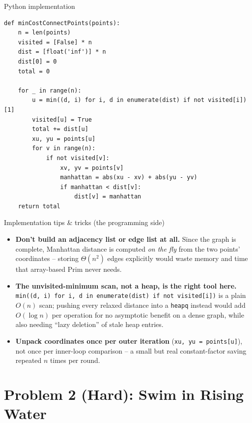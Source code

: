 \documentclass[11pt,aspectratio=169]{beamer}
\begin{document}
\begin{frame}[fragile]{Python implementation}
  \begin{lstlisting}[style=py,aboveskip=0pt,belowskip=0pt]
def minCostConnectPoints(points):
    n = len(points)
    visited = [False] * n
    dist = [float('inf')] * n
    dist[0] = 0
    total = 0

    for _ in range(n):
        u = min((d, i) for i, d in enumerate(dist) if not visited[i])[1]
        visited[u] = True
        total += dist[u]
        xu, yu = points[u]
        for v in range(n):
            if not visited[v]:
                xv, yv = points[v]
                manhattan = abs(xu - xv) + abs(yu - yv)
                if manhattan < dist[v]:
                    dist[v] = manhattan
    return total
  \end{lstlisting}
\end{frame}

\begin{frame}{Implementation tips \& tricks (the programming side)}
  \small
  \begin{itemize}
    \item \textbf{Don't build an adjacency list or edge list at all.} Since the
    graph is complete, Manhattan distance is computed \emph{on the fly} from the
    two points' coordinates -- storing $\Theta(n^2)$ edges explicitly would waste
    memory and time that array-based Prim never needs.
    \item \textbf{The unvisited-minimum scan, not a heap, is the right tool
    here.} \texttt{min((d, i) for i, d in enumerate(dist) if not visited[i])} is
    a plain $O(n)$ scan; pushing every relaxed distance into a \texttt{heapq}
    instead would add $O(\log n)$ per operation for no asymptotic benefit on a
    dense graph, while also needing ``lazy deletion'' of stale heap entries.
    \item \textbf{Unpack coordinates once per outer iteration}
    (\texttt{xu, yu = points[u]}), not once per inner-loop comparison -- a small
    but real constant-factor saving repeated $n$ times per round.
  \end{itemize}
\end{frame}

\section{Problem 2 (Hard): Swim in Rising Water}
\end{document}
